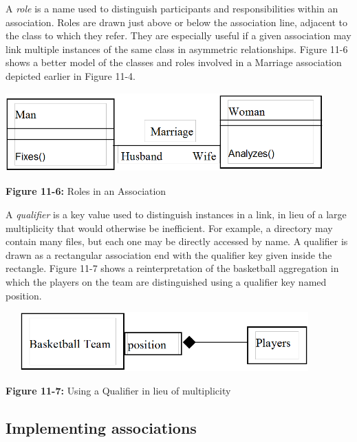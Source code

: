 A \textit{role} is a name used to distinguish
participants and responsibilities within an association. Roles are
drawn just above or below the association line, adjacent to the class
to which they refer. They are especially useful if a given association
may link multiple instances of the same class in asymmetric
relationships. Figure 11-6 shows a better model of the classes and
roles involved in a Marriage association depicted earlier in Figure
11-4.

\bigskip

\includegraphics[width=4.8in,height=1.2in]{ub-img/roles.png}


{\sffamily\bfseries Figure 11-6:}
{\sffamily Roles in an Association}

\bigskip

A \textit{qualifier} is a key value used to
distinguish instances in a link, in lieu of a large
multiplicity that would otherwise be inefficient. For example, a
directory may contain many files, but each one may be directly accessed
by name. A qualifier is drawn as a rectangular association end with the
qualifier key given inside the rectangle. Figure 11-7 shows a
reinterpretation of the basketball aggregation in which the players on
the team are distinguished using a qualifier key named position.


\bigskip

\includegraphics[width=4.8in,height=0.9in]{ub-img/qualifier.png}

{\sffamily\bfseries Figure 11-7:}
{\sffamily Using a Qualifier in lieu of multiplicity}

\subsection{Implementing associations}

